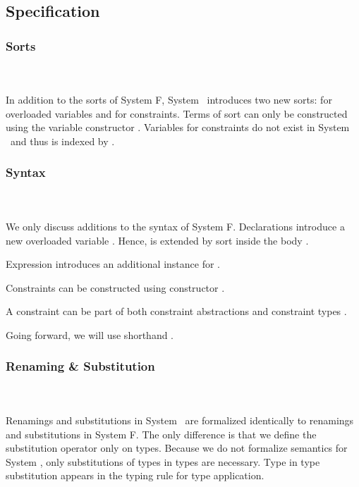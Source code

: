 \subsection{Specification}

\subsubsection{Sorts}\hfill\\\\
In addition to the sorts of System F, System \Fo\ introduces two new sorts:  for overloaded variables and  for constraints.
\FoSort
Terms of sort  can only be constructed using the variable constructor .
Variables for constraints do not exist in System \Fo\ and thus  is indexed by .

\subsubsection{Syntax}\hfill\\\\
We only discuss additions to the syntax of System F.
\FoTerm
Declarations   introduce a new overloaded variable . 
Hence,  is extended by sort  inside the body . 

\noindent Expression   \Constr{=}    introduces an additional instance for .

\noindent Constraints  can be constructed using constructor  \Constr{:} . 

\noindent A constraint  can be part of both constraint abstractions \Constr{\lambdabar}    and constraint types \Constr{[}  \Constr{]⇒} .

\noindent Going forward, we will use shorthand \FoCstr.

\subsubsection{Renaming \& Substitution}\hfill\\\\
Renamings and substitutions in System \Fo\ are formalized identically to renamings and substitutions in System F. 
The only difference is that we define the substitution operator only on types. 
\Fosubs
Because we do not formalize semantics for System \Fo, only substitutions of types in types are necessary. Type in type substitution appears in the typing rule for type application.

